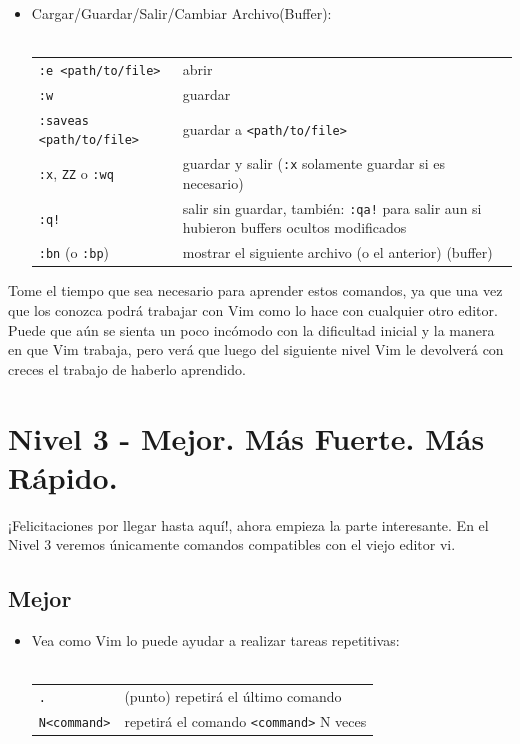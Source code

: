 \documentclass[12pt]{article}
\begin{document}
\begin{itemize}
	\item Cargar/Guardar/Salir/Cambiar Archivo(Buffer): \\ \\
\begin{tabular}{ l l }
            \texttt{:e <path/to/file>} & abrir \\
            \texttt{:w} & guardar \\
            \texttt{:saveas <path/to/file>} & guardar a \texttt{<path/to/file>} \\
            \texttt{:x}, \texttt{ZZ} o \texttt{:wq} & guardar y salir (\texttt{:x} solamente guardar si es necesario) \\
            \texttt{:q!} & salir sin guardar, también: \texttt{:qa!} para salir aun si hubieron buffers ocultos modificados \\
            \texttt{:bn} (o \texttt{:bp}) & mostrar el siguiente archivo (o el anterior) (buffer) \\
\end{tabular}
\end{itemize}



Tome el tiempo que sea necesario para aprender estos comandos,
ya que una vez que los conozca podrá trabajar con Vim como lo
hace con cualquier otro editor. Puede que aún se sienta un poco incómodo 
con la dificultad inicial y la manera en que Vim trabaja, pero verá
que luego del siguiente nivel Vim le devolverá con creces el trabajo
de haberlo aprendido.


\section{Nivel 3 - Mejor. Más Fuerte. Más Rápido.}


¡Felicitaciones por llegar hasta aquí!, ahora empieza la parte interesante.
En el Nivel 3 veremos únicamente comandos compatibles con el viejo editor vi.


\subsection{Mejor}


\begin{itemize}
	\item Vea como Vim lo puede ayudar a realizar tareas repetitivas: \\ \\
\begin{tabular}{ l l }
	\texttt{.} & (punto) repetirá el último comando \\
	\texttt{N<command>} & repetirá el comando \texttt{<command>} N veces \\
\end{tabular}
\end{itemize}
\end{document}

